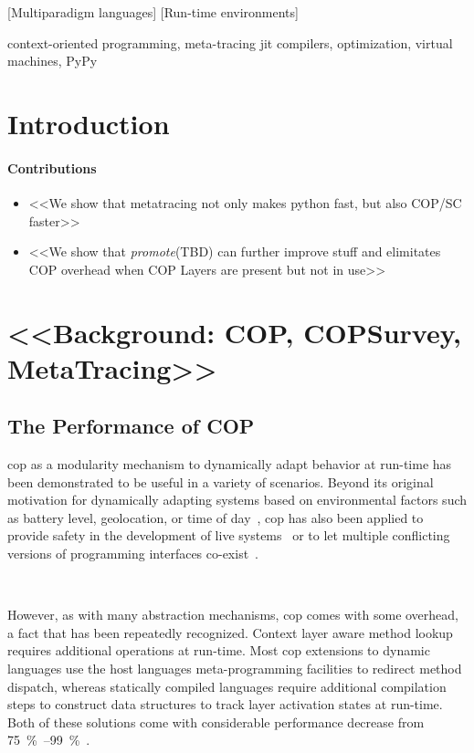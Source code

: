 \documentclass[preprint,english,10pt,nonatbib]{sigplanconf}
\begin{document}
[Mul\-ti\-par\-a\-digm languages]
[Run-time environments]

\keywords
context-oriented programming,
meta-tracing \acs{jit} compilers,
optimization,
virtual machines,
PyPy

\section{Introduction}

\paragraph*{Contributions}

\begin{itemize}
\item <<We show that metatracing not only makes python fast, but also COP/SC
  faster>>
\item <<We show that \emph{promote}(TBD) can further improve stuff and
  elimitates COP overhead when COP Layers are present but not in use>>
\end{itemize}

\section{<<Background: COP, COPSurvey, MetaTracing>>}

\subsection{The Performance of COP}
\label{sec:performance-cop}
\ac{cop} as a modularity mechanism to dynamically adapt behavior at run-time has
been demonstrated to be useful in a variety of scenarios. Beyond its original
motivation for dynamically adapting systems based on environmental factors such
as battery level, geolocation, or time of day~, \ac{cop} has also
been applied to provide safety in the development of live
systems~\cite{lincke+:2012:scoping-changes} or to let multiple conflicting
versions of programming interfaces co-exist~.

~\cite{lincke+:2011:implementing-scoped}

However, as with many abstraction mechanisms, \ac{cop} comes with some overhead,
a fact that has been repeatedly recognized. Context layer aware method lookup
requires additional operations at run-time. Most \ac{cop} extensions to dynamic
languages use the host languages meta-programming facilities to redirect method
dispatch, whereas statically compiled languages require additional compilation
steps to construct data structures to track layer activation states at
run-time. Both of these solutions come with considerable performance decrease
from \SIrange{75}{99}\percent~\cite{appeltauer+:2009:comparison-context-oriented}.
\end{document}

